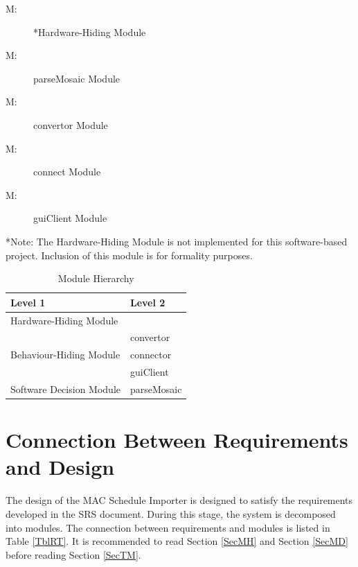 \documentclass[12pt, titlepage]{article}
\newcounter{mnum}
\newcommand{\mthemnum}{M\themnum}
\begin{document}
\begin{description}
\item [ \mthemnum \label{mHH}:] *Hardware-Hiding Module
\item [ \mthemnum \label{mpM}:] parseMosaic Module
\item [ \mthemnum \label{mcv}:] convertor Module
\item [ \mthemnum \label{mcn}:] connect Module
\item [ \mthemnum \label{mgc}:] guiClient Module
\end{description}

*Note: The Hardware-Hiding Module is not implemented for this software-based project. Inclusion of this module is for formality purposes.

\begin{table}[h!]
\centering
\begin{tabular}{p{} p{}}
\toprule
\textbf{Level 1} & \textbf{Level 2}\\
\midrule

{Hardware-Hiding Module} & ~ \\
\midrule

\multirow{3}{0.3\textwidth}{Behaviour-Hiding Module} & convertor\\
& connector\\
& guiClient\\
\midrule

\multirow{1}{0.3\textwidth}{Software Decision Module} & parseMosaic\\
\bottomrule

\end{tabular}
\caption{Module Hierarchy}
\label{TblMH}
\end{table}

\section{Connection Between Requirements and Design} \label{SecConnection}

The design of the MAC Schedule Importer is designed to satisfy the requirements developed in
the SRS document. During this stage, the system is decomposed into modules. The connection
between requirements and modules is listed in Table \ref{TblRT}. It is recommended to read Section \ref{SecMH} and Section \ref{SecMD} before reading Section \ref{SecTM}.\\
\end{document}
